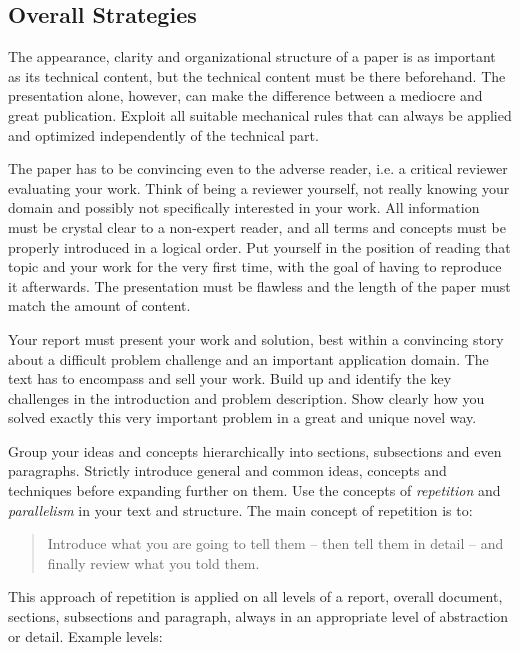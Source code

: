 \documentclass[11pt, a4paper,oneside,chapterprefix=false]{scrbook}
\begin{document}
\subsection*{Overall Strategies}

The appearance, clarity and organizational structure of a paper is as important as its technical content, but the technical content must be there beforehand. The presentation alone, however, can make the difference between a mediocre and great publication. Exploit all suitable mechanical rules that can always be applied and optimized independently of the technical part.

The paper has to be convincing even to the adverse reader, i.e. a critical reviewer evaluating your work. Think of being a reviewer yourself, not really knowing your domain and possibly not specifically interested in your work. All information must be crystal clear to a non-expert reader, and all terms and concepts must be properly introduced in a logical order. Put yourself in the position of reading that topic and your work for the very first time, with the goal of having to reproduce it afterwards. The presentation must be flawless and the length of the paper must match the amount of content.

Your report must present your work and solution, best within a convincing story about a difficult problem challenge and an important application domain. The text has to encompass and sell your work. Build up and identify the key challenges in the introduction and problem description. Show clearly how you solved exactly this very important problem in a great and unique novel way.

Group your ideas and concepts hierarchically into sections, subsections and even paragraphs. Strictly introduce general and common ideas, concepts and techniques before expanding further on them. Use the concepts of \emph{repetition} and \emph{parallelism} in your text and structure. The main concept of repetition is to:

\begin{quotation}
Introduce what you are going to tell them -- then tell them in detail -- and finally review what you told them.
\end{quotation}

This approach of repetition is applied on all levels of a report, overall document, sections, subsections and paragraph, always in an appropriate level of abstraction or detail. Example levels:
\end{document}
